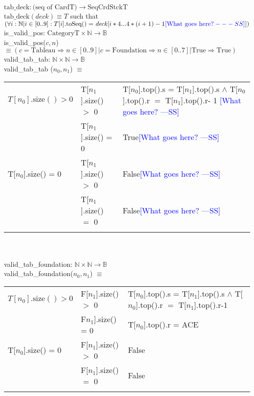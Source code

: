 \documentclass[12pt]{article}
\newcommand{\authornote}[3]{\textcolor{#1}{[#3 ---#2]}}
\newcommand{\authornote}[3]{}
\newcommand{\wss}[1]{\authornote{blue}{SS}{#1}}
\begin{document}
\noindent $\text{tab\_deck}: \text{(seq of CardT)} \rightarrow \text{SeqCrdStckT}$\\
\noindent $\text{tab\_deck} (\mathit{deck}) \equiv T$ such that
$(\forall i: \mathbb{N} | i \in [0..9] : T[i].\text{toSeq}() =
\mathit{deck}[i*4...4*(i+1)-1\wss{\text{What goes here?}}])$\\

\noindent is\_valid\_pos: $ \text{CategoryT} \times \mathbb{N} \rightarrow \mathbb{B}$\\
\noindent is\_valid\_pos($c, n$) $\equiv (c = \text{Tableau} \Rightarrow n \in
[0..9] | c = \text{Foundation} \Rightarrow n \in [0..7] | \text{True} \Rightarrow \text{True})$\\

\noindent valid\_tab\_tab: $\mathbb{N} \times \mathbb{N} \rightarrow \mathbb{B}$\\
\noindent valid\_tab\_tab ($n_0, n_1$) $\equiv$

\begin{tabular}{|p{4cm}|p{3.5cm}|p{9.5cm}|}
\hhline{|-|-|-|}
$T[n_0].\text{size}() > 0$ & T[$n_1$].size() $>$ 0 & T[$n_0$].top().s = T[$n_1$].top().s $\wedge$
  T[$n_0$].top().r $= $ T[$n_1$].top().r- 1 \wss{What goes here?}\\
\hhline{|~|-|-|}
 & T[$n_1$].size() = 0 & True\wss{What goes here?}\\
\hhline{|-|-|-|}
T[$n_0$].size() = 0 & T[$n_1$].size() $>$ 0 & False\wss{What goes here?}\\
\hhline{|~|-|-|}
& T[$n_1$].size() $=$ 0 & False\wss{What goes here?}\\
\hhline{|-|-|-|}
\end{tabular}\\\\

\noindent valid\_tab\_foundation: $\mathbb{N} \times \mathbb{N} \rightarrow \mathbb{B}$\\
\noindent valid\_tab\_foundation($n_0, n_1$) $\equiv$ 

\begin{tabular}{|p{4cm}|p{3.5cm}|p{9.5cm}|}
\hhline{|-|-|-|}
$T[n_0].\text{size}() > 0$ & F[$n_1$].size() $>$ 0 & T[$n_0$].top().s = T[$n_1$].top().s $\wedge$ T[$n_0$].top().r $=$ T[$n_1$].top().r-1 \\
\hhline{|~|-|-|}
 & F$n_1$].size() = 0 & T[$n_0$].top().r = ACE\\
\hhline{|-|-|-|}
T[$n_0$].size() = 0 & F[$n_1$].size() $>$ 0 & False\\
\hhline{|~|-|-|}
& F[$n_1$].size() $=$ 0 & False\\
\hhline{|-|-|-|}
\end{tabular}\\\\
\end{document}
